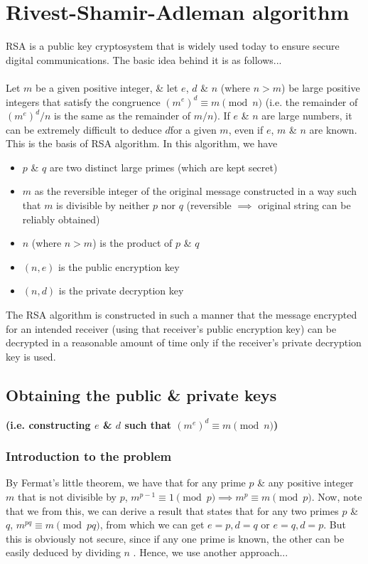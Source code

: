 \section{Rivest-Shamir-Adleman algorithm}
RSA is a public key cryptosystem that is widely used today to ensure secure digital communications. The basic idea behind it is as follows...
\\~\\
Let $m$ be a given positive integer, \& let $e$, $d$ \& $n$ (where $n>m$) be large positive integers that satisfy the congruence $(m^e)^d \equiv m \pmod n$ (i.e. the remainder of $(m^e)^d/n$ is the same as the remainder of $m/n$). If  $e$ \& $n$ are large numbers, it can be extremely difficult to deduce  $d$for a given  $m$, even if $e$, $m$ \& $n$ are known. This is the basis of RSA algorithm. In this algorithm, we have

\begin{itemize}
	\item $p$ \& $q$ are two distinct large primes (which are kept secret)
	\item $m$ as the reversible integer of the original message constructed in a way such that $m$ is divisible by neither $p$ nor $q$ (reversible $\implies$ original string can be reliably obtained)
	\item $n$ (where $n>m$) is the product of $p$ \& $q$
	\item $(n, e)$ is the public encryption key
	\item  $(n, d)$ is the private decryption key
\end{itemize}

The RSA algorithm is constructed in such a manner that the message encrypted for an intended receiver (using that receiver's public encryption key) can be decrypted in a reasonable amount of time only if the receiver's private decryption key is used.

\subsection{Obtaining the public \& private keys}
\textbf{(i.e. constructing $e$ \& $d$ such that $(m^e)^d \equiv m \pmod n$)}
\subsubsection{Introduction to the problem}
By Fermat's little theorem, we have that for any prime $p$ \& any positive integer $m$ that is not divisible by $p$, $m^{p-1} \equiv 1 \pmod p \implies m^p \equiv m \pmod p$. Now, note that we from this, we can derive a result that states that for any two primes $p$ \& $q$, $m^{pq} \equiv m \pmod {pq}$, from which we can get $e=p, d=q$ or $e=q, d=p$. But this is obviously not secure, since if any one prime is known, the other can be easily deduced by dividing $n$ . Hence, we use another approach...


